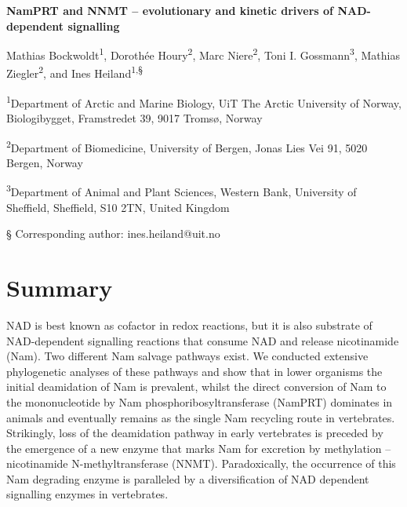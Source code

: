 
\noindent
{\huge\sffamily\bfseries NamPRT and NNMT – evolutionary and kinetic drivers of NAD-dependent signalling \par}

\vspace{5mm}


\noindent
Mathias Bockwoldt\textsuperscript{1}, Dorothée Houry\textsuperscript{2}, Marc Niere\textsuperscript{2}, Toni I. Gossmann\textsuperscript{3}, Mathias Ziegler\textsuperscript{2}, and Ines Heiland\textsuperscript{1,§}

\vspace{1cm}

\noindent
\textsuperscript{1}Department of Arctic and Marine Biology, UiT The Arctic University of Norway, Biologibygget, Framstredet 39, 9017 Tromsø, Norway

\noindent
\textsuperscript{2}Department of Biomedicine, University of Bergen, Jonas Lies Vei 91, 5020 Bergen, Norway

\noindent
\textsuperscript{3}Department of Animal and Plant Sciences, Western Bank, University of Sheffield, Sheffield, S10 2TN, United Kingdom

\noindent
§ Corresponding author: ines.heiland@uit.no


\section*{Summary}

NAD is best known as cofactor in redox reactions, but it is also substrate of NAD-dependent signalling reactions that consume NAD and release nicotinamide (Nam). Two different Nam salvage pathways exist. We conducted extensive phylogenetic analyses of these pathways and show that in lower organisms the initial deamidation of Nam is prevalent, whilst the direct conversion of Nam to the mononucleotide by Nam phosphoribosyltransferase (NamPRT) dominates in animals and eventually remains as the single Nam recycling route in vertebrates. Strikingly, loss of the deamidation pathway in early vertebrates is preceded by the emergence of a new enzyme that marks Nam for excretion by methylation – nicotinamide N-methyltransferase (NNMT). Paradoxically, the occurrence of this Nam degrading enzyme is paralleled by a diversification of NAD dependent signalling enzymes in vertebrates.

